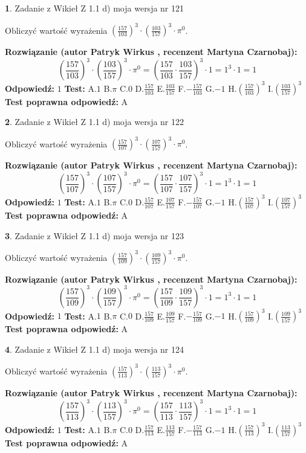 \documentclass[12pt, a4paper]{article}
\theoremstyle{definition} %
\newtheorem{zad}{}
\newcommand{\zadStart}[1]{\begin{zad}#1\newline}
\newcommand{\zadStop}{\end{zad}}
\newcommand{\rozwStart}[2]{\noindent \textbf{Rozwiązanie (autor #1 , recenzent #2): }\newline}
\newcommand{\rozwStop}{\newline}
\newcommand{\odpStart}{\noindent \textbf{Odpowiedź:}\newline}
\newcommand{\odpStop}{\newline}
\newcommand{\testStart}{\noindent \textbf{Test:}\newline}
\newcommand{\testStop}{\newline}
\newcommand{\kluczStart}{\noindent \textbf{Test poprawna odpowiedź:}\newline}
\newcommand{\kluczStop}{\newline}
\begin{document}
\zadStart{Zadanie z Wikieł Z 1.1 d) moja wersja nr 121}

Obliczyć wartość wyrażenia $(\frac{157}{103})^{3} \cdot (\frac{103}{157})^{3} \cdot \pi^{0}$.
\zadStop
\rozwStart{Patryk Wirkus}{Martyna Czarnobaj}
$$(\frac{157}{103})^{3} \cdot (\frac{103}{157})^{3} \cdot \pi^{0} = (\frac{157}{103} \cdot \frac{103}{157})^{3} \cdot 1 = 1^{3} \cdot 1 = 1$$
\rozwStop
\odpStart
$1$
\odpStop
\testStart
A.$1$ B.$\pi$ C.$0$ D.$\frac{157}{103}$ E.$\frac{103}{157}$
F.$-\frac{157}{103}$ G.$-1$
H.$(\frac{157}{103})^{3}$
I.$(\frac{103}{157})^{3}$
\testStop
\kluczStart
A
\kluczStop



\zadStart{Zadanie z Wikieł Z 1.1 d) moja wersja nr 122}

Obliczyć wartość wyrażenia $(\frac{157}{107})^{3} \cdot (\frac{107}{157})^{3} \cdot \pi^{0}$.
\zadStop
\rozwStart{Patryk Wirkus}{Martyna Czarnobaj}
$$(\frac{157}{107})^{3} \cdot (\frac{107}{157})^{3} \cdot \pi^{0} = (\frac{157}{107} \cdot \frac{107}{157})^{3} \cdot 1 = 1^{3} \cdot 1 = 1$$
\rozwStop
\odpStart
$1$
\odpStop
\testStart
A.$1$ B.$\pi$ C.$0$ D.$\frac{157}{107}$ E.$\frac{107}{157}$
F.$-\frac{157}{107}$ G.$-1$
H.$(\frac{157}{107})^{3}$
I.$(\frac{107}{157})^{3}$
\testStop
\kluczStart
A
\kluczStop



\zadStart{Zadanie z Wikieł Z 1.1 d) moja wersja nr 123}

Obliczyć wartość wyrażenia $(\frac{157}{109})^{3} \cdot (\frac{109}{157})^{3} \cdot \pi^{0}$.
\zadStop
\rozwStart{Patryk Wirkus}{Martyna Czarnobaj}
$$(\frac{157}{109})^{3} \cdot (\frac{109}{157})^{3} \cdot \pi^{0} = (\frac{157}{109} \cdot \frac{109}{157})^{3} \cdot 1 = 1^{3} \cdot 1 = 1$$
\rozwStop
\odpStart
$1$
\odpStop
\testStart
A.$1$ B.$\pi$ C.$0$ D.$\frac{157}{109}$ E.$\frac{109}{157}$
F.$-\frac{157}{109}$ G.$-1$
H.$(\frac{157}{109})^{3}$
I.$(\frac{109}{157})^{3}$
\testStop
\kluczStart
A
\kluczStop



\zadStart{Zadanie z Wikieł Z 1.1 d) moja wersja nr 124}

Obliczyć wartość wyrażenia $(\frac{157}{113})^{3} \cdot (\frac{113}{157})^{3} \cdot \pi^{0}$.
\zadStop
\rozwStart{Patryk Wirkus}{Martyna Czarnobaj}
$$(\frac{157}{113})^{3} \cdot (\frac{113}{157})^{3} \cdot \pi^{0} = (\frac{157}{113} \cdot \frac{113}{157})^{3} \cdot 1 = 1^{3} \cdot 1 = 1$$
\rozwStop
\odpStart
$1$
\odpStop
\testStart
A.$1$ B.$\pi$ C.$0$ D.$\frac{157}{113}$ E.$\frac{113}{157}$
F.$-\frac{157}{113}$ G.$-1$
H.$(\frac{157}{113})^{3}$
I.$(\frac{113}{157})^{3}$
\testStop
\kluczStart
A
\kluczStop
\end{document}
